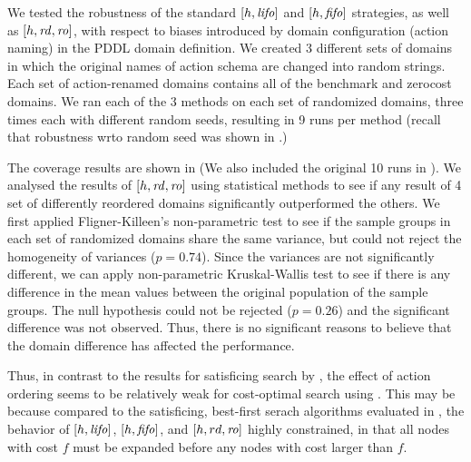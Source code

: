 
We tested the robustness of the standard $[h,\mbox{\textit{lifo}}]$ and $[h,\mbox{\textit{fifo}}]$ strategies, as well as $[h,\mbox{\textit{rd}},\mbox{\textit{ro}}]$,
with respect to 
biases introduced by domain configuration (action naming) in the PDDL domain definition.
We created 3 different sets of domains in which the
original names of action schema are changed into random strings. 
Each set of action-renamed domains contains all of the benchmark and zerocost
domains.
We ran each of the 3 methods on each
set of randomized domains, three times each with different random seeds,
resulting in 9 runs per method (recall that robustness wrto random seed was shown in .)

The coverage results are shown in  (We
also included the original 10 runs in ).
We analysed the results of $[h,\mbox{\textit{rd}},\mbox{\textit{ro}}]$ using statistical methods
to see if any result of 4 set of differently reordered domains
significantly outperformed the others.
We first applied Fligner-Killeen's non-parametric test to see if the sample groups 
in each set of randomized domains share the same variance, 
but could not reject the homogeneity of variances ($p=0.74$).
Since the variances are not significantly different,
we can apply non-parametric Kruskal-Wallis test to see if
there is any difference in the mean values between the original
population of the sample groups.
The null hypothesis could not be rejected ($p=0.26$) and the significant
difference was not observed.
Thus, there is no significant reasons to believe that the domain
difference has affected the performance.

Thus, in contrast to the results for satisficing search by \cite{vallati2015effective}, 
the effect of action ordering  seems to be relatively weak for cost-optimal search using \astar.
This may be because 
compared to the satisficing, best-first serach algorithms evaluated in \cite{vallati2015effective},
the behavior of $[h,\mbox{\textit{lifo}}]$, $[h,\mbox{\textit{fifo}}]$, and $[h,rd,\mbox{\textit{ro}}]$ highly
constrained, in that all nodes with cost $f$ must be expanded before any
nodes with cost larger than $f$.


